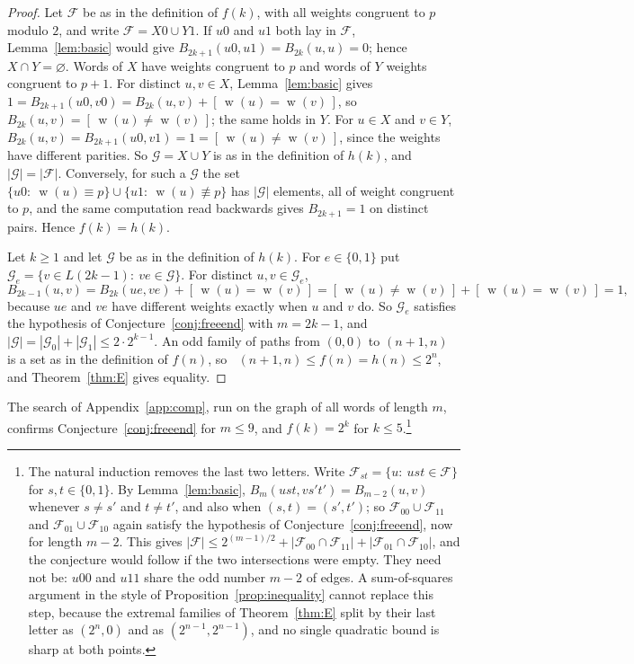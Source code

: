 \documentclass[11pt]{amsart}
\theoremstyle{definition}
\theoremstyle{remark}
\numberwithin{equation}{section}
\newcommand{\cF}{\mathcal{F}}
\newcommand{\cG}{\mathcal{G}}
\newcommand{\Iv}[1]{[\,#1\,]}
\DeclareMathOperator{\wt}{w}
\DeclareMathOperator{\Modd}{M_{od}}
\begin{document}
\begin{proof}
Let $\cF$ be as in the definition of $f(k)$, with all weights congruent to $p$ modulo $2$, and write $\cF=X0\cup Y1$. If $u0$ and $u1$ both lay in $\cF$, Lemma~\ref{lem:basic} would give $B_{2k+1}(u0,u1)=B_{2k}(u,u)=0$; hence $X\cap Y=\varnothing$. Words of $X$ have weights congruent to $p$ and words of $Y$ weights congruent to $p+1$. For distinct $u,v\in X$, Lemma~\ref{lem:basic} gives $1=B_{2k+1}(u0,v0)=B_{2k}(u,v)+\Iv{\wt(u)=\wt(v)}$, so $B_{2k}(u,v)=\Iv{\wt(u)\ne\wt(v)}$; the same holds in $Y$. For $u\in X$ and $v\in Y$, $B_{2k}(u,v)=B_{2k+1}(u0,v1)=1=\Iv{\wt(u)\ne\wt(v)}$, since the weights have different parities. So $\cG=X\cup Y$ is as in the definition of $h(k)$, and $|\cG|=|\cF|$. Conversely, for such a $\cG$ the set $\{u0:\ \wt(u)\equiv p\}\cup\{u1:\ \wt(u)\not\equiv p\}$ has $|\cG|$ elements, all of weight congruent to $p$, and the same computation read backwards gives $B_{2k+1}=1$ on distinct pairs. Hence $f(k)=h(k)$.

Let $k\ge1$ and let $\cG$ be as in the definition of $h(k)$. For $e\in\{0,1\}$ put $\cG_e=\{v\in L(2k-1):\ ve\in\cG\}$. For distinct $u,v\in\cG_e$,
\[
B_{2k-1}(u,v)=B_{2k}(ue,ve)+\Iv{\wt(u)=\wt(v)}=\Iv{\wt(u)\ne\wt(v)}+\Iv{\wt(u)=\wt(v)}=1,
\]
because $ue$ and $ve$ have different weights exactly when $u$ and $v$ do. So $\cG_e$ satisfies the hypothesis of Conjecture~\ref{conj:freeend} with $m=2k-1$, and $|\cG|=|\cG_0|+|\cG_1|\le2\cdot2^{k-1}$. An odd family of paths from $(0,0)$ to $(n+1,n)$ is a set as in the definition of $f(n)$, so $\Modd(n+1,n)\le f(n)=h(n)\le2^n$, and Theorem~\ref{thm:E} gives equality.
\end{proof}

The search of Appendix~\ref{app:comp}, run on the graph of all words of length $m$, confirms Conjecture~\ref{conj:freeend} for $m\le9$, and $f(k)=2^k$ for $k\le5$.\footnote{The natural induction removes the last two letters. Write $\cF_{st}=\{u:\ ust\in\cF\}$ for $s,t\in\{0,1\}$. By Lemma~\ref{lem:basic}, $B_m(ust,vs't')=B_{m-2}(u,v)$ whenever $s\ne s'$ and $t\ne t'$, and also when $(s,t)=(s',t')$; so $\cF_{00}\cup\cF_{11}$ and $\cF_{01}\cup\cF_{10}$ again satisfy the hypothesis of Conjecture~\ref{conj:freeend}, now for length $m-2$. This gives $|\cF|\le2^{(m-1)/2}+|\cF_{00}\cap\cF_{11}|+|\cF_{01}\cap\cF_{10}|$, and the conjecture would follow if the two intersections were empty. They need not be: $u00$ and $u11$ share the odd number $m-2$ of edges. A sum-of-squares argument in the style of Proposition~\ref{prop:inequality} cannot replace this step, because the extremal families of Theorem~\ref{thm:E} split by their last letter as $(2^n,0)$ and as $(2^{n-1},2^{n-1})$, and no single quadratic bound is sharp at both points.}
\end{document}
